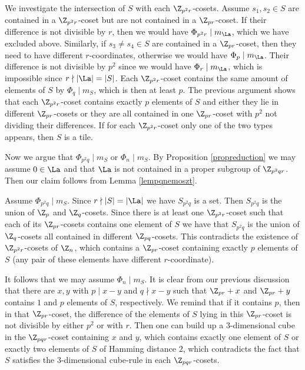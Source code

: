         We investigate the intersection of $S$ with each $\Z_{p ^2r}$-cosets. Assume $s_1,s_2 \in S$ are contained in a $\Z_{p ^2r}$-coset but are not contained in a $\Z_{pr}$-coset.
        If their difference is not divisible by $r$, then we would have $\Phi_{p^2r} \mid m_{\La}$, which we have excluded above. 
        Similarly, if $s_3 \ne s_4 \in S$ are contained in a $\Z_{pr}$-coset, then they need to have different $r$-coordinates, otherwise we would have $\Phi_p \mid m_{\La}$.
        Their difference is not divisible by $p^2$ since we would have $\Phi_r \mid m_{\La}$, which is impossible since $r \nmid |\La|=|S|$.
        Each $\Z_{p^2r}$-coset contains the same amount of elements of $S$ by $\Phi_q \mid m_S$, which is then at least $p$. The previous argument shows that each $\Z_{p^2r}$-coset contains exactly $p$  elements of $S$ and either they lie in different $\Z_{pr}$-cosets or they are all contained in one $\Z_{pr}$-coset with $p^2$ not dividing their differences.
        If for each  $\Z_{p^2r}$-coset only one of the two types appears, then $S$ is a tile. 
        
        Now we argue that $\Phi_{p^2q} \mid m_S$ or $\Phi_{n} \mid m_S$. By Proposition \ref{propreduction} we may assume $0 \in \La$ and that $\La$ is not contained in a proper subgroup of $\Z_{p^2qr}$. Then our claim follows from Lemma \ref{lempqnemoszt}.
        
         Assume  $\Phi_{p^2q} \mid m_S$. Since $r \nmid |S|=|\La|$ we have $S_{p^2q}$ is a set. Then $S_{p^2q}$ is the union of $\Z_p$ and $\Z_q$-cosets. 
        Since there is at least one $\Z_{p^2r}$-coset such that each of its $\Z_{pr}$-cosets contains one element of $S$ we have that $S_{p^2q}$ is the union of $\Z_q$-cosets all contained in different $\Z_{pq}$-cosets.
        This contradicts the existence of $\Z_{p^2r}$-cosets of $\Z_{n}$, which contains a $\Z_{pr}$-coset containing exactly $p$ elements of $S$ (any pair of these elements have different $r$-coordinate).
        
        It follows that we may assume $\Phi_{n} \mid m_S$. It is clear from our previous discussion that there are $x,y$ with $p \mid x-y$ and $q \nmid x-y$ such that $\Z_{pr}+x$ and $\Z_{pr}+y$ 
        contains $1$ and $p$ elements of $S$, respectively. 
        We remind that if it contains $p$, then in that $\Z_{pr}$-coset, the  difference of the elements of $S$ lying in this $\Z_{pr}$-coset is not divisible by either $p^2$ or with $r$.
        Then one can build up a $3$-dimensional cube in the $\Z_{pqr}$-coset containing $x$ and $y$, which contains exactly one element of $S$ or exactly two elements of $S$ of Hamming distance $2$, which contradicts the fact that $S$ satisfies the $3$-dimensional cube-rule in each $\Z_{pqr}$-cosets. 
        
